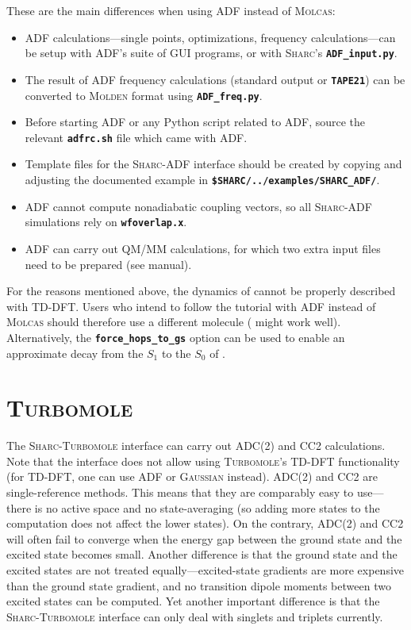 \documentclass[a4paper,11pt,DIV=15,openany]{scrbook}
\makeatletter
\newcommand{\refermanual}[2][rectangle,draw=B,thick,fill=black!5,inner sep=1pt,outer sep=0pt,rounded corners]{\marginpar{\tikz[baseline=(current bounding box.north)]\node at (0,0) [#1]{\begin{tabular}{@{}l@{}}See\\ section\\ \ref*{#2}\\ (p. \pageref*{#2})\\ in the\\ manual.\end{tabular}};}}
\newcommand{\sharc}{\textsc{Sharc}}
\newcommand{\ttt}[1]{\textbf{\texttt{#1}}}
\makeatother
\begin{document}
These are the main differences when using ADF instead of \textsc{Molcas}:
\begin{itemize}
  \item ADF calculations---single points, optimizations, frequency calculations---can be setup with ADF's suite of GUI programs, or with \sharc's \ttt{ADF\_input.py}.
  \item The result of ADF frequency calculations (standard output or \ttt{TAPE21}) can be converted to \textsc{Molden} format using \ttt{ADF\_freq.py}.
  \item Before starting ADF or any Python script related to ADF, source the relevant \ttt{adfrc.sh} file which came with ADF.
  \item Template files for the \sharc-ADF interface should be created by copying and adjusting the documented example in \ttt{\$SHARC/../examples/SHARC\_ADF/}.
  \item ADF cannot compute nonadiabatic coupling vectors, so all \sharc-ADF simulations rely on \ttt{wfoverlap.x}.
  \item ADF can carry out QM/MM calculations, for which two extra input files need to be prepared (see manual).
\end{itemize}

For the reasons mentioned above, the dynamics of  cannot be properly described with TD-DFT.
Users who intend to follow the tutorial with ADF instead of \textsc{Molcas} should therefore use a different molecule ( might work well).
Alternatively, the \ttt{force\_hops\_to\_gs} option can be used to enable an approximate decay from the $S_1$ to the $S_0$ of  .


\section{\textsc{Turbomole}}
\refermanual{m-sec:int:ricc2}

The \sharc-\textsc{Turbomole} interface can carry out ADC(2) and CC2 calculations.
Note that the interface does not allow using \textsc{Turbomole}'s TD-DFT functionality (for TD-DFT, one can use ADF or \textsc{Gaussian} instead).
ADC(2) and CC2 are single-reference methods.
This means that they are comparably easy to use---there is no active space and no state-averaging (so adding more states to the computation does not affect the lower states).
On the contrary, ADC(2) and CC2 will often fail to converge when the energy gap between the ground state and the excited state becomes small.
Another difference is that the ground state and the excited states are not treated equally---excited-state gradients are more expensive than the ground state gradient, and no transition dipole moments between two excited states can be computed.
Yet another important difference is that the \sharc-\textsc{Turbomole} interface can only deal with singlets and triplets currently.
\end{document}
